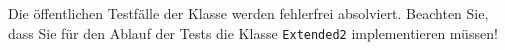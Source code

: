 Die \"offentlichen Testf\"alle der Klasse \texttt{\testLvB} werden
fehlerfrei absolviert. Beachten Sie, dass Sie f\"ur den Ablauf der Tests
die Klasse \texttt{\testAdapter{}Extended2} implementieren m\"ussen!
